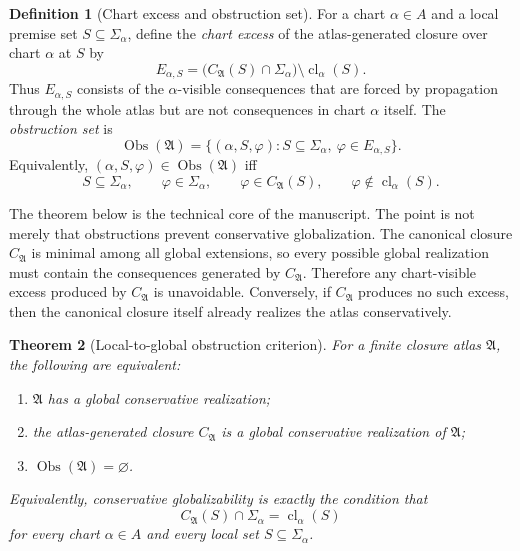 \documentclass[11pt]{amsart}
\numberwithin{equation}{section}
\theoremstyle{plain}
\newtheorem{theorem}{Theorem}[section]
\theoremstyle{definition}
\newtheorem{definition}[theorem]{Definition}
\theoremstyle{remark}
\newcommand{\Cl}{\operatorname{cl}}
\newcommand{\A}{\mathfrak A}
\newcommand{\Sig}{\Sigma}
\newcommand{\Obs}{\operatorname{Obs}}
\newcommand{\CA}{C_{\mathfrak A}}
\begin{document}
\begin{definition}[Chart excess and obstruction set]
\label{def:atlas-obstruction-set}
For a chart \(\alpha\in A\) and a local premise set \(S\subseteq\Sig_\alpha\), define the \emph{chart excess} of the atlas-generated closure over chart \(\alpha\) at \(S\) by
\[
  E_{\alpha,S}
  =
  \bigl(\CA(S)\cap\Sig_\alpha\bigr)\setminus \Cl_\alpha(S).
\]
Thus \(E_{\alpha,S}\) consists of the \(\alpha\)-visible consequences that are forced by propagation through the whole atlas but are not consequences in chart \(\alpha\) itself.  The \emph{obstruction set} is
\[
  \Obs(\A)
  =
  \{(\alpha,S,\varphi):
      S\subseteq\Sig_\alpha,
      \ \varphi\in E_{\alpha,S}\}.
\]
Equivalently, \((\alpha,S,\varphi)\in\Obs(\A)\) iff
\[
  S\subseteq\Sig_\alpha,
  \qquad
  \varphi\in\Sig_\alpha,
  \qquad
  \varphi\in\CA(S),
  \qquad
  \varphi\notin\Cl_\alpha(S).
\]
\end{definition}

The theorem below is the technical core of the manuscript.  The point is not merely that obstructions prevent conservative globalization.  The canonical closure \(\CA\) is minimal among all global extensions, so every possible global realization must contain the consequences generated by \(\CA\).  Therefore any chart-visible excess produced by \(\CA\) is unavoidable.  Conversely, if \(\CA\) produces no such excess, then the canonical closure itself already realizes the atlas conservatively.

\begin{theorem}[Local-to-global obstruction criterion]
\label{thm:complete-closure-atlas-obstruction}
For a finite closure atlas \(\A\), the following are equivalent:
\begin{enumerate}[label=\textup{(\roman*)}]
  \item \(\A\) has a global conservative realization;
  \item the atlas-generated closure \(\CA\) is a global conservative realization of \(\A\);
  \item \(\Obs(\A)=\varnothing\).
\end{enumerate}
Equivalently, conservative globalizability is exactly the condition that
\[
  \CA(S)\cap\Sig_\alpha=\Cl_\alpha(S)
\]
for every chart \(\alpha\in A\) and every local set \(S\subseteq\Sig_\alpha\).
\end{theorem}
\end{document}
